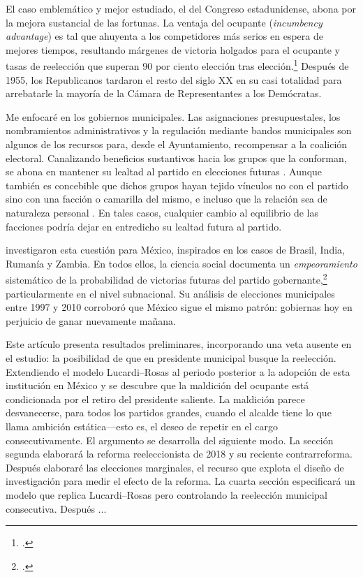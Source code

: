 \documentclass[letter,12pt]{article}
\begin{document}
El caso emblemático y mejor estudiado, el del Congreso estadunidense, abona por la mejora sustancial de las fortunas. La ventaja del ocupante (\emph{incumbency advantage}) es tal que ahuyenta a los competidores más serios en espera de mejores tiempos, resultando márgenes de victoria holgados para el ocupante y tasas de reelección que superan 90 por ciento elección tras elección.\footnote{\citet{erikson1971incumbency, mayhew1974vanishingMg, jacobson.1987.runningScared, cox.katz.1996, ansolabehere.snyder.IncAdv2002, gelman.king.1991incumbency}.} Después de 1955, los Republicanos tardaron el resto del siglo XX en su casi totalidad para arrebatarle la mayoría de la Cámara de Representantes a los Demócratas. 

Me enfocaré en los gobiernos municipales. Las asignaciones presupuestales, los nombramientos administrativos y la regulación mediante bandos municipales son algunos de los recursos para, desde el Ayuntamiento, recompensar a la coalición electoral. Canalizando beneficios sustantivos hacia los grupos que la conforman, se abona en mantener su lealtad al partido en elecciones futuras \citep{cox.mccubbins.1986, stokes.Argentina2005, diaz-estevez-magaloni-Poverty-book.2016}. Aunque también es concebible que dichos grupos hayan tejido vínculos no con el partido sino con una facción o camarilla del mismo, e incluso que la relación sea de naturaleza personal \citep{cain.etal.1987}. En tales casos, cualquier cambio al equilibrio de las facciones podría dejar en entredicho su lealtad futura al partido.

\citet{lucardi.rosas.Incumbency.2016} investigaron esta cuestión para México, inspirados en los casos de Brasil, India, Rumanía y Zambia. En todos ellos, la ciencia social documenta un \emph{empeoramiento} sistemático de la probabilidad de victorias futuras del partido gobernante,\footnote{\citet{brambor.ceneviva.BrasilReeleccionMunic.2012, klasnja.titiunik.IncumbCurse.2023, uppal.IncumbencyIndia.2009}.} particularmente en el nivel subnacional. Su análisis de elecciones municipales entre 1997 y 2010 corroboró que México sigue el mismo patrón: gobiernas hoy en perjuicio de ganar nuevamente mañana.

Este artículo presenta resultados preliminares, incorporando una veta ausente en el estudio: la posibilidad de que en presidente municipal busque la reelección. Extendiendo el modelo Lucardi--Rosas al periodo posterior a la adopción de esta institución en México y se descubre que la maldición del ocupante está condicionada por el retiro del presidente saliente. La maldición parece desvanecerse, para todos los partidos grandes, cuando el alcalde tiene lo que \citet{schlesinger.1966} llama ambición estática---esto es, el deseo de repetir en el cargo consecutivamente. El argumento se desarrolla del siguiente modo. La sección segunda elaborará la reforma reeleccionista de 2018 y su reciente contrarreforma. Después elaboraré las elecciones marginales, el recurso que explota el diseño de investigación para medir el efecto de la reforma. La cuarta sección especificará un modelo que replica Lucardi--Rosas pero controlando la reelección municipal consecutiva. Después ...
\end{document}
